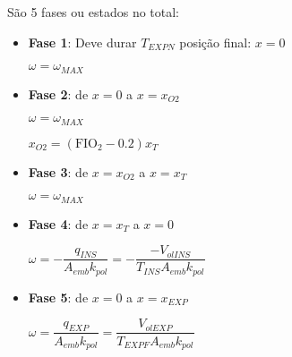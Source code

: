 \documentclass[a4paper,twosides,10pt]{article}
\begin{document}
São 5 fases ou estados no total:

\begin{itemize}
\item \textbf{Fase 1}: Deve durar $T_{EXPN}$
  posição final: $x = 0$
  
  $\omega = \omega_{MAX}$

\item \textbf{Fase 2}: de $x = 0$ a $x = x_{O2}$

    $\omega = \omega_{MAX}$

    $x_{O2} = (\mathrm{FIO_2} - 0.2) x_T$

  \item \textbf{Fase 3}: de $x = x_{O2}$ a $x = x_T$

    $\omega = \omega_{MAX}$

  \item \textbf{Fase 4}: de $x = x_T$ a $x = 0$

    $\omega = - \dfrac{q_{INS}}{A_{emb}k_{pol}} = - \dfrac{-V_{olINS}}{T_{INS}A_{emb}k_{pol}}$
    
  \item \textbf{Fase 5}: de $x = 0$ a $x = x_{EXP}$

    $\omega = \dfrac{q_{EXP}}{A_{emb}k_{pol}} = \dfrac{V_{olEXP}}{T_{EXPF}A_{emb}k_{pol}}$
    
\end{itemize}
\end{document}
